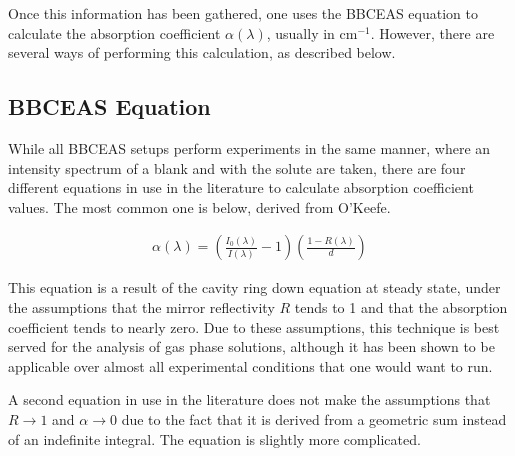 Once this information has been gathered, one uses the \ac{BBCEAS} equation to
calculate the absorption coefficient $\alpha(\lambda)$, usually in cm$^{-1}$.
However, there are several ways of performing this calculation, as described
below. 



\subsection{BBCEAS Equation}

While all \ac{BBCEAS} setups perform experiments in the same manner, where an
intensity spectrum of a blank and with the solute are taken, there are four
different equations in use in the literature to calculate absorption
coefficient values. The most common one is below, derived from
O'Keefe.

  \begin{align}
    \alpha(\lambda) = \left(\frac{I_0(\lambda)}{I(\lambda)}-1\right)\left(\frac{1-R(\lambda)}{d}\right)\label{eq:ceas_std}
  \end{align}

This equation is a result of the cavity ring down equation at steady state,
under the assumptions that the mirror reflectivity $R$ tends to 1 and that the
absorption coefficient tends to nearly zero. Due to these assumptions, this
technique is best served for the analysis of gas phase solutions, although it
has been shown to be applicable over almost all experimental conditions that
one would want to run.

A second equation in use in the literature does not make the assumptions
that $R \to 1$ and $\alpha \to 0$ due to the fact that it is derived from a
geometric sum instead of an indefinite integral. The equation is slightly more
complicated.

